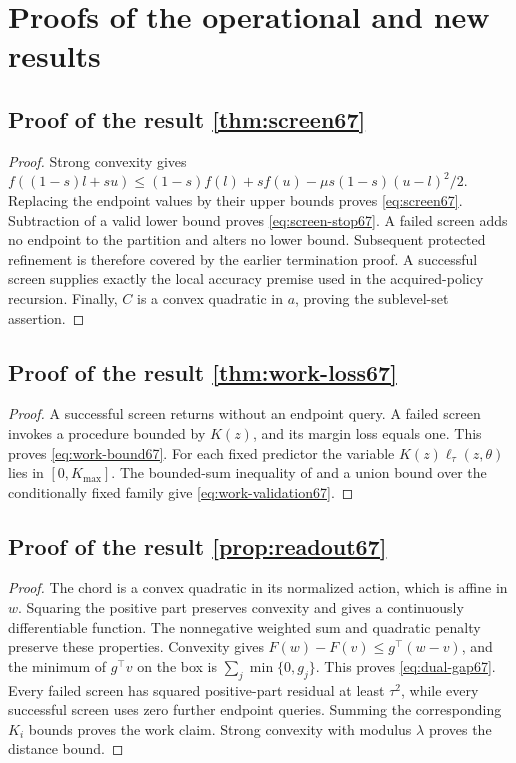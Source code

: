 \section{Proofs of the operational and new results}\label{supp:proofs70}
\subsection{Proof of the result \ref{thm:screen67}}\label{supp:proof70-operational67-1}
\begin{proof}
Strong convexity gives $f((1-s)l+su)\le(1-s)f(l)+sf(u)-\mu s(1-s)(u-l)^2/2$. Replacing the endpoint values by their upper bounds proves \eqref{eq:screen67}. Subtraction of a valid lower bound proves \eqref{eq:screen-stop67}. A failed screen adds no endpoint to the partition and alters no lower bound. Subsequent protected refinement is therefore covered by the earlier termination proof. A successful screen supplies exactly the local accuracy premise used in the acquired-policy recursion. Finally, $C$ is a convex quadratic in $a$, proving the sublevel-set assertion.
\end{proof}

\subsection{Proof of the result \ref{thm:work-loss67}}\label{supp:proof70-operational67-2}
\begin{proof}
A successful screen returns without an endpoint query. A failed screen invokes a procedure bounded by $K(z)$, and its margin loss equals one. This proves \eqref{eq:work-bound67}. For each fixed predictor the variable $K(z)\ell_\tau(z,\theta)$ lies in $[0,K_{\max}]$. The bounded-sum inequality of \citet{hoeffding1963} and a union bound over the conditionally fixed family give \eqref{eq:work-validation67}.
\end{proof}

\subsection{Proof of the result \ref{prop:readout67}}\label{supp:proof70-operational67-3}
\begin{proof}
The chord is a convex quadratic in its normalized action, which is affine in $w$. Squaring the positive part preserves convexity and gives a continuously differentiable function. The nonnegative weighted sum and quadratic penalty preserve these properties. Convexity gives $F(w)-F(v)\le g^\top(w-v)$, and the minimum of $g^\top v$ on the box is $\sum_j\min\{0,g_j\}$. This proves \eqref{eq:dual-gap67}. Every failed screen has squared positive-part residual at least $\tau^2$, while every successful screen uses zero further endpoint queries. Summing the corresponding $K_i$ bounds proves the work claim. Strong convexity with modulus $\lambda$ proves the distance bound.
\end{proof}

